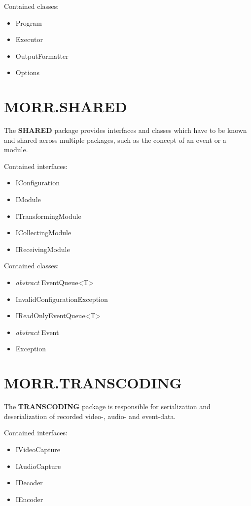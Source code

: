 Contained classes:
\begin{itemize}
\item Program
\item Executor
\item OutputFormatter
\item Options
\end{itemize}

\newpage
\section{MORR.SHARED}

The \textbf{SHARED} package provides interfaces and classes which have to be known and shared across multiple packages, such as the concept of an event or a module.

Contained interfaces:
\begin{itemize}
\item IConfiguration
\item IModule
\item ITransformingModule
\item ICollectingModule
\item IReceivingModule
\end{itemize}

Contained classes:
\begin{itemize}
\item \textit{abstract} EventQueue<T>
\item InvalidConfigurationException
\item IReadOnlyEventQueue<T>
\item \textit{abstract} Event
\item Exception
\end{itemize}

\newpage
\section{MORR.TRANSCODING}

The \textbf{TRANSCODING} package is responsible for serialization and deserialization of recorded video-, audio- and event-data. 

Contained interfaces:
\begin{itemize}
\item IVideoCapture
\item IAudioCapture
\item IDecoder
\item IEncoder
\end{itemize}

